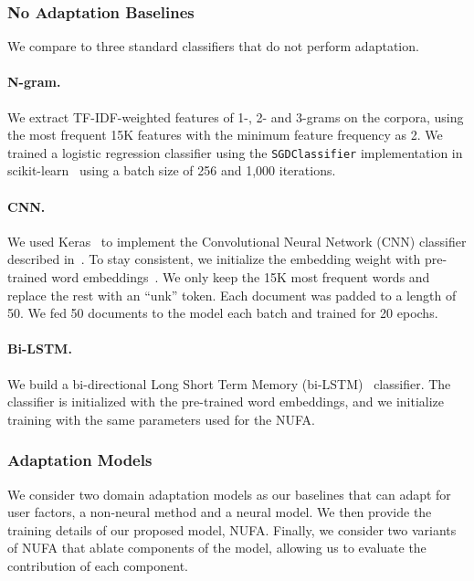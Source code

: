 \subsubsection{No Adaptation Baselines}
We compare to three standard classifiers that do not perform adaptation.

\paragraph{N-gram.} We extract TF-IDF-weighted features of 1-, 2- and 3-grams on the corpora, using the most frequent 15K features with the minimum feature frequency as 2.
We trained a logistic regression classifier using the \texttt{SGDClassifier} implementation in scikit-learn~\cite{pedregosa2011scikit}
using a batch size of 256 and 1,000 iterations. 

\paragraph{CNN.} 
We used Keras~\cite{chollet2015keras} to implement the Convolutional Neural Network (CNN) classifier described in~\cite{kim2014convolutional}. To stay consistent, we initialize the embedding weight with pre-trained word embeddings~\cite{mikolov2013distributed,pennington2014glove}. We only keep the 15K most frequent words and replace the rest with an ``unk'' token. Each document was padded to a length of 50. We fed 50 documents to the model each batch and trained for 20 epochs.

\paragraph{Bi-LSTM.} We build a bi-directional Long Short Term Memory (bi-LSTM)~\cite{hochreiter1997long} classifier. The classifier is initialized with the pre-trained word embeddings, and we initialize training with the same parameters used for the NUFA.


\subsubsection{Adaptation Models}

We consider two domain adaptation models as our baselines that can adapt for user factors, a non-neural method and a neural model.
We then provide the training details of our proposed model, NUFA.
Finally, we consider two variants of NUFA that ablate components of the model, allowing us to evaluate the contribution of each component.

